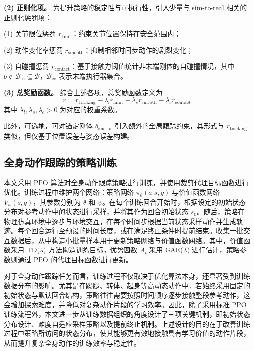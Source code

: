\textbf{(2) 正则化项。}
为提升策略的稳定性与可执行性，引入少量与 sim-to-real 相关的正则化惩罚项：

(1) 关节限位惩罚 $r_{\text{limit}}$：约束关节位置保持在安全范围内；

(2) 动作变化率惩罚 $r_{\text{smooth}}$：抑制相邻时间步动作的剧烈变化；

(3) 自碰撞惩罚 $r_{\text{contact}}$：基于接触力阈值统计非末端刚体的自碰撞情况，其中 $b \notin \mathcal{B}_{\text{ee}} \subseteq \mathcal{B}$，$\mathcal{B}_{\text{ee}}$ 表示末端执行器集合。

\textbf{(3) 总奖励函数。}
综合上述各项，总奖励函数定义为
\begin{equation}
	r = r_{\text{tracking}} - \lambda_l r_{\text{limit}} - \lambda_s r_{\text{smooth}} - \lambda_c r_{\text{contact}}
\end{equation}
其中 $\lambda_l, \lambda_s, \lambda_c > 0$ 为对应的权重系数。

此外，可选地，可对锚定刚体 $b_{\text{anchor}}$ 引入额外的全局跟踪约束，其形式与 $r_{\text{tracking}}$ 类似，但仅基于位置误差与姿态误差构建。


\subsection{全身动作跟踪的策略训练}

本文采用 PPO 算法对全身动作跟踪策略进行训练，并使用裁剪代理目标函数进行优化。训练过程中维护两个网络：策略网络 $\pi_\theta(a|s,g)$ 与价值函数网络 $V_\psi(s,g)$，其参数分别为 $\theta$ 和 $\psi$。在每个训练回合开始时，根据设定的初始状态分布对参考动作中的状态进行采样，并将其作为回合初始状态 $s_0$。随后，策略在物理仿真环境中逐步与环境交互，在每个时间步根据当前状态采样动作并生成轨迹。每个回合运行至预设的时间长度，或在满足终止条件时提前结束。收集一批交互数据后，从中构造小批量样本用于更新策略网络与价值函数网络。其中，价值函数采用 TD($\lambda$) 方法构造训练目标，优势函数 $A_t$ 采用 GAE($\lambda$) 进行估计，策略参数则通过 PPO 的代理目标函数进行更新。

对于全身动作跟踪任务而言，训练过程不仅取决于优化算法本身，还显著受到训练数据分布的影响。尤其是在踢腿、转体、起身等高动态动作中，若始终采用固定的初始状态与默认回合结构，策略往往需要按照时间顺序逐步接触整段参考动作，这会增加探索难度，并降低对复杂动作片段的学习效率。因此，除了采用标准 PPO 训练流程外，本文进一步从训练数据组织的角度设计了三项关键机制，即初始状态分布设计、难度自适应采样策略以及提前终止机制。上述设计的目的在于改善训练过程中策略所访问的状态分布，使其能够更有效地接触具有学习价值的动作片段，从而提升复杂全身动作的训练效率与稳定性。

